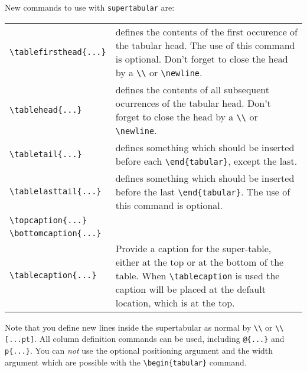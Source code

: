 New commands to use with \verb|supertabular| are:
\begin{center}
\begin{tabular}{l p{8cm}}
\verb|\tablefirsthead{...}| & defines the contents of the first occurence of
                            the tabular head.
                            The use of this command is optional.
                         Don't forget to close the head by a \verb|\\|
                         or \verb|\newline|.                        \\
\verb|\tablehead{...}| & defines the contents of all subsequent ocurrences of
                         the tabular head.
                         Don't forget to close the head by a \verb|\\|
                         or \verb|\newline|.                        \\
\verb|\tabletail{...}| & defines something which should be inserted
                         before each \verb|\end{tabular}|, except the last.\\
\verb|\tablelasttail{...}| & defines something which should be inserted
                             before the last \verb|\end{tabular}|.
                             The use of this command is optional.\\
\verb|\topcaption{...}|     &\\
\verb|\bottomcaption{...}|  &\\
\verb|\tablecaption{...}|   & Provide a caption for the super-table, either
                              at the top or at the bottom of the table. When
                              \verb|\tablecaption| is used the caption will
                              be placed at the default location, which is at
                              the top.\\
\end{tabular}
\end{center}
Note that you define new lines inside the supertabular as normal by
\verb|\\| or \verb|\\[...pt]|. All column definition commands can be
used, including \verb|@{...}| and \verb|p{...}|. You can {\it not} use
the optional positioning argument and the width argument which are
possible with the \verb|\begin{tabular}| command.
 
